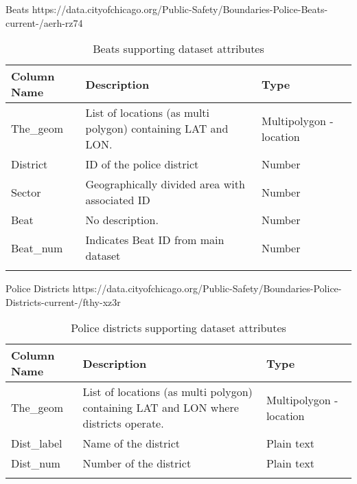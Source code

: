 Beats \newline
https://data.cityofchicago.org/Public-Safety/Boundaries-Police-Beats-current-/aerh-rz74
\begin{center}
\begin{longtable}{|m{6em}|m{18em}|m{7em}|}
    \hline
    Column Name & 
    Description & 
    Type\\
    \hline
    The\_geom & 
    List of locations (as multi polygon) containing LAT and LON. & 
    Multipolygon - location\\
    \hline
    District & 
    ID of the police district & 
    Number\\
    \hline
    Sector & 
    Geographically divided area with associated ID & 
    Number\\
    \hline
    Beat & 
    No description. & 
    Number\\
    \hline
    Beat\_num & 
    Indicates Beat ID from main dataset &
    Number\\
    \hline
\caption{Beats supporting dataset attributes}
\end{longtable}
\end{center}

Police Districts \newline
https://data.cityofchicago.org/Public-Safety/Boundaries-Police-Districts-current-/fthy-xz3r
\begin{center}
\begin{longtable}{|m{6em}|m{18em}|m{7em}|}
    \hline
    Column Name & 
    Description & 
    Type\\
    \hline
    The\_geom & 
    List of locations (as multi polygon) containing LAT and LON where districts operate.  & 
    Multipolygon - location\\
    \hline
    Dist\_label & 
    Name of the district & 
    Plain text\\
    \hline
    Dist\_num & 
    Number of the district & 
    Plain text\\
    \hline
\caption{Police districts supporting dataset attributes}
\end{longtable}
\end{center}

